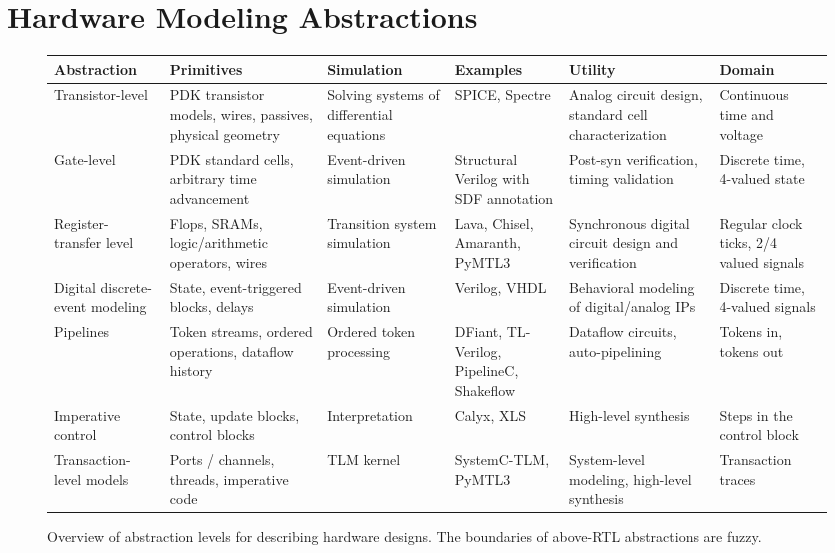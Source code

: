 \documentclass[sigplan,review,nonacm,9pt]{acmart}
\begin{document}

\maketitle

\section{Hardware Modeling Abstractions}

\begin{figure*}[!hbt]
\small
\begin{tabular}{>{\raggedright\arraybackslash}p{2cm}>{\raggedright\arraybackslash}p{3cm}>{\raggedright\arraybackslash}p{2cm}>{\raggedright\arraybackslash}p{3cm}>{\raggedright\arraybackslash}p{3cm}>{\raggedright\arraybackslash}p{2cm}}\toprule
\textbf{Abstraction} & \textbf{Primitives} & \textbf{Simulation} & \textbf{Examples} & \textbf{Utility} & \textbf{Domain} \\\midrule
Transistor-level & PDK transistor models, wires, passives, physical geometry & Solving systems of differential equations & SPICE, Spectre & Analog circuit design, standard cell characterization & Continuous time and voltage\\\midrule
Gate-level & PDK standard cells, arbitrary time advancement & Event-driven simulation & Structural Verilog with SDF annotation & Post-syn verification, timing validation & Discrete time, 4-valued state\\\midrule
Register-transfer level & Flops, SRAMs, logic/arithmetic operators, wires & Transition system simulation & Lava\cite{lava}, Chisel\cite{chisel}, Amaranth\cite{amaranth}, PyMTL3\cite{pymtl3} & Synchronous digital circuit design and verification & Regular clock ticks, 2/4 valued signals\\\midrule
Digital discrete-event modeling & State, event-triggered blocks, delays & Event-driven simulation & Verilog, VHDL & Behavioral modeling of digital/analog IPs & Discrete time, 4-valued signals\\\midrule
Pipelines & Token streams, ordered operations, dataflow history & Ordered token processing & DFiant\cite{dfiant}, TL-Verilog\cite{tlverilog}, PipelineC\cite{pipelinec}, Shakeflow\cite{shakeflow} & Dataflow circuits, auto-pipelining & Tokens in, tokens out\\\midrule
Imperative control & State, update blocks, control blocks & Interpretation & Calyx\cite{calyx}, XLS\cite{xls} & High-level synthesis & Steps in the control block\\\midrule
Transaction-level models & Ports / channels, threads, imperative code & TLM kernel & SystemC-TLM, PyMTL3 & System-level modeling, high-level synthesis & Transaction traces\\\bottomrule
\end{tabular}
\caption{Overview of abstraction levels for describing hardware designs. The boundaries of above-RTL abstractions are fuzzy.}
\label{fig:abstractions}
\end{figure*}
\end{document}

